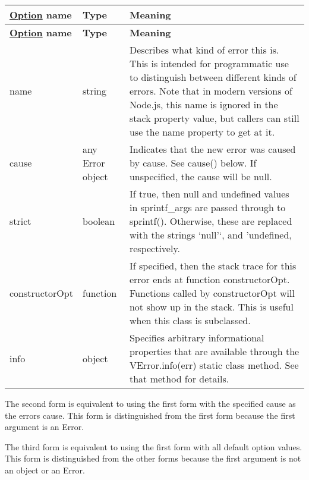 \tabulinesep=1mm
\begin{longtabu} spread 0pt [c]{*{3}{|X[-1]}|}
\hline
\rowcolor{\tableheadbgcolor}\textbf{ \mbox{\hyperlink{structOption}{Option}} name  }&\textbf{ Type  }&\textbf{ Meaning   }\\
\endfirsthead
\hline
\endfoot
\hline
\rowcolor{\tableheadbgcolor}\textbf{ \mbox{\hyperlink{structOption}{Option}} name  }&\textbf{ Type  }&\textbf{ Meaning   }\\
\endhead
{\ttfamily name}  &string  &Describes what kind of error this is. This is intended for programmatic use to distinguish between different kinds of errors. Note that in modern versions of Node.\+js, this name is ignored in the {\ttfamily stack} property value, but callers can still use the {\ttfamily name} property to get at it.   \\
{\ttfamily cause}  &any Error object  &Indicates that the new error was caused by {\ttfamily cause}. See {\ttfamily cause()} below. If unspecified, the cause will be {\ttfamily null}.   \\
{\ttfamily strict}  &boolean  &If true, then {\ttfamily null} and {\ttfamily undefined} values in {\ttfamily sprintf\+\_\+args} are passed through to {\ttfamily sprintf()}. Otherwise, these are replaced with the strings `\textquotesingle{}null'`, and '{\ttfamily undefined}\textquotesingle{}, respectively.   \\
{\ttfamily constructor\+Opt}  &function  &If specified, then the stack trace for this error ends at function {\ttfamily constructor\+Opt}. Functions called by {\ttfamily constructor\+Opt} will not show up in the stack. This is useful when this class is subclassed.   \\
{\ttfamily info}  &object  &Specifies arbitrary informational properties that are available through the {\ttfamily V\+Error.\+info(err)} static class method. See that method for details.   \\
\end{longtabu}


The second form is equivalent to using the first form with the specified {\ttfamily cause} as the error\textquotesingle{}s cause. This form is distinguished from the first form because the first argument is an Error.

The third form is equivalent to using the first form with all default option values. This form is distinguished from the other forms because the first argument is not an object or an Error.

